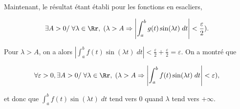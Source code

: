 {\begin{enumerate}
{Maintenant, le résultat étant établi pour les fonctions en esacliers, 

$$\exists A>0/\;\forall\lambda\in\Rr,\;
(\lambda>A\Rightarrow\left|\int_{a}^{b}g(t)\sin(\lambda t)\;dt\right|<\frac{\varepsilon}{2}).$$

Pour $\lambda>A$, on a alors $\left|\int_{a}^{b}f(t)\sin(\lambda t)\;dt\right|<\frac{\varepsilon}{2}+\frac{\varepsilon}{2}=\varepsilon$. On a montré que 

$$\forall\varepsilon>0,\exists A>0/\;\forall\lambda\in\Rr,\;(\lambda>A\Rightarrow\left|\int_{a}^{b}f(t)\sin(\lambda t)\;dt\right|<\varepsilon),$$

et donc que $\int_{a}^{b}f(t)\sin(\lambda t)\;dt$ tend vers $0$ quand $\lambda$ tend vers $+\infty$.}
\end{enumerate}
}
